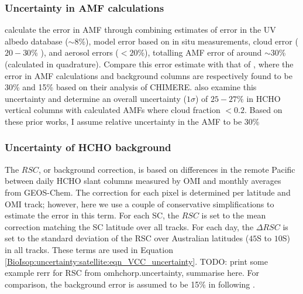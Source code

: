     \subsubsection{Uncertainty in AMF calculations}
    \label{BioIsop:uncertainty:satellite:AMF}
      
      \textcite{Palmer2006} calculate the error in AMF through combining estimates of error in the UV albedo database ($\sim 8$\%), model error based on in situ measurements, cloud error  ($20-30$\% \parencite{Martin2003}), and aerosol errors ($<20$\%), totalling AMF error of around $\sim 30$\% (calculated in quadrature).
      Compare this error estimate with that of \textcite{Curci2010}, where the error in AMF calculations and background columns are respectively found to be 30\% and 15\% based on their analysis of CHIMERE.
      \textcite{Millet2008} also examine this uncertainty and determine an overall uncertainty ($1\sigma$) of $25-27\%$ in HCHO vertical columns with calculated AMFs where cloud fraction $< 0.2$.
      Based on these prior works, I assume relative uncertainty in the AMF to be 30\%
      
    \subsubsection{Uncertainty of HCHO background}
      \label{BioIsop:uncertainty:satellite:background}
      
      
      
      
      The $RSC$, or background correction, is based on differences in the remote Pacific between daily HCHO slant columns measured by OMI and monthly averages from GEOS-Chem.
      The correction for each pixel is determined per latitude and OMI track; however, here we use a couple of conservative simplifications to estimate the error in this term.
      For each SC, the $RSC$ is set to the mean correction matching the SC latitude over all tracks.
      For each day, the $\Delta RSC$ is set to the standard deviation of the RSC over Australian latitudes ($45$\degr S to $10$\degr S) in all tracks.
      These terms are used in Equation \ref{BioIsop:uncertainty:satellite:eqn_VCC_uncertainty}.
      TODO: print some example rerr for RSC from omhchorp.uncertainty, summarise here.
      For comparison, the background error is assumed to be 15\% in \textcite{Curci2010} following \parencite{Dufour2009}.
      
